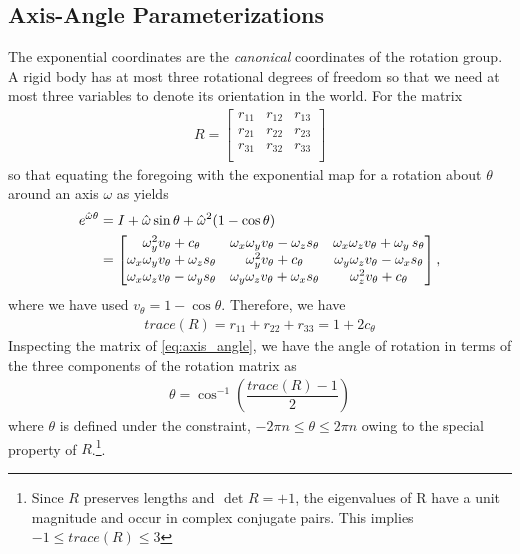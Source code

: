 \subsection{Axis-Angle Parameterizations}
The exponential coordinates are the \textit{canonical} coordinates of the rotation group. A rigid body has at most three rotational degrees of freedom so that we need at most three variables to denote its orientation in the world. For the matrix 
%
\begin{align}
	R = \begin{bmatrix}
	r_{11} & r_{12} & r_{13} \\
	r_{21} & r_{22} & r_{23} \\
	r_{31} & r_{32} & r_{33} \\
	\end{bmatrix}
\end{align}
%
so that equating the foregoing with the exponential map for a rotation about $\theta$ around an axis $\omega$ as yields
%
\begin{align}
	e^{\hat{\omega}\theta}  &= \identity + \hat{\omega} \sin \theta + \hat{\omega}^2(1 - \cos \theta) \\%
	& = \begin{bmatrix}
	\omega_y^2 v_\theta + c_\theta  & \omega_x\omega_y v_\theta - \omega_z s_\theta & \omega_x \omega_z v_\theta + \omega_y \, s_\theta \\
	\omega_x \omega_y v_\theta + \omega_z s_\theta  & \omega_y^2 v_\theta+ c_\theta & \omega_y \omega_z v_\theta - \omega_x s_\theta \\
	\omega_x \omega_z v_\theta - \omega_y s_\theta  & \omega_y \omega_z v_\theta + \omega_x s_\theta & \omega_z^2 v_\theta + c_\theta
	\end{bmatrix},
	\label{eq:axis_angle}
\end{align}
%
where we have used $v_\theta = 1 - \cos \theta$. Therefore, we have
%
\begin{align}
	trace(R) = r_{11}  + r_{22}  + r_{33} = 1 + 2 c_\theta
\end{align}
%
Inspecting the matrix of \eqref{eq:axis_angle}, we have the angle of rotation in terms of the three components of the rotation matrix as 
%
\begin{align}
	\theta = \cos^{-1}\left(\dfrac{trace(R) -1}{2}\right)
	\label{eq:angle_part}
\end{align}
% 
where $\theta$ is defined under the constraint, $-2\pi n \le \theta \le 2 \pi n$  owing to the special property of $R$.\footnote{Since $R$ preserves lengths and $\text{ det } R = + 1$, the eigenvalues of R have a unit magnitude and occur in complex conjugate pairs. This implies $-1 \le trace(R) \le 3$}. 


